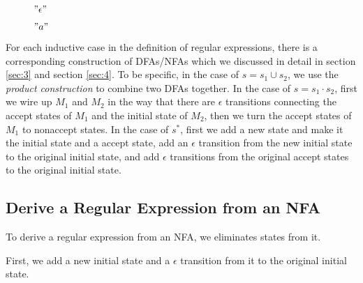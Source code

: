 \documentclass[11pt]{article}
\begin{document}
\begin{figure}[ht]
    \centering
    \caption{$"\epsilon"$}
    \label{fig:fig21}
\end{figure}

\begin{figure}[ht]
    \centering
    \caption{$"a"$}
    \label{fig:fig22}
\end{figure}

For each inductive case in the definition of regular expressions, there is
a corresponding construction of DFAs/NFAs which we discussed in detail in
section \ref{sec:3} and section \ref{sec:4}. To be specific, in the case of
$s = s_1 \cup s_2$, we use the \emph{product construction} to combine two
DFAs together. In the case of $s = s_1 \cdot s_2$, first we wire up $M_1$
and $M_2$ in the way that there are $\epsilon$ transitions connecting the
accept states of $M_1$ and the initial state of $M_2$, then we turn the
accept states of $M_1$ to nonaccept states. In the case of $s^\ast$, first
we add a new state and make it the initial state and a accept state, add
an $\epsilon$ transition from the new initial state to the original initial
state, and add $\epsilon$ transitions from the original accept states to
the original initial state.

\subsection{Derive a Regular Expression from an NFA}

To derive a regular expression from an NFA, we eliminates states from it.

First, we add a new initial state and a $\epsilon$ transition from it to
the original initial state.
\end{document}
